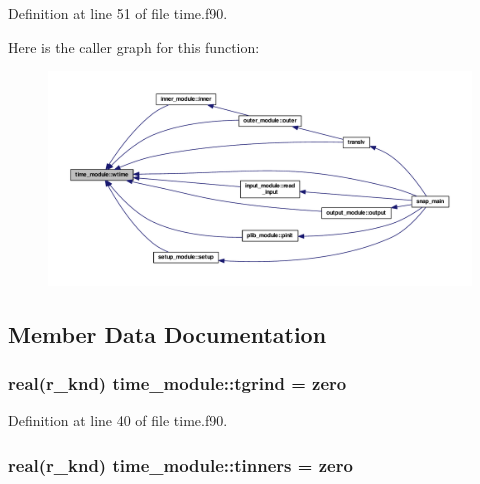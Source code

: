 Definition at line 51 of file time.\-f90.



Here is the caller graph for this function\-:\nopagebreak
\begin{figure}[H]
\begin{center}
\leavevmode
\includegraphics[width=350pt]{classtime__module_ad86f74c6ac28ecc6b163c6f777732f28_icgraph}
\end{center}
\end{figure}




\subsection{Member Data Documentation}
\hypertarget{classtime__module_a83421671217058a30dcccb2ea5b80cc6}{
\subsubsection[{tgrind}]{\setlength{\rightskip}{0pt plus 5cm}real(r\-\_\-knd) time\-\_\-module\-::tgrind = zero}}\label{classtime__module_a83421671217058a30dcccb2ea5b80cc6}


Definition at line 40 of file time.\-f90.

\hypertarget{classtime__module_a034b038776e4e01f89f2eee00a20f968}{
\subsubsection[{tinners}]{\setlength{\rightskip}{0pt plus 5cm}real(r\-\_\-knd) time\-\_\-module\-::tinners = zero}}\label{classtime__module_a034b038776e4e01f89f2eee00a20f968}


